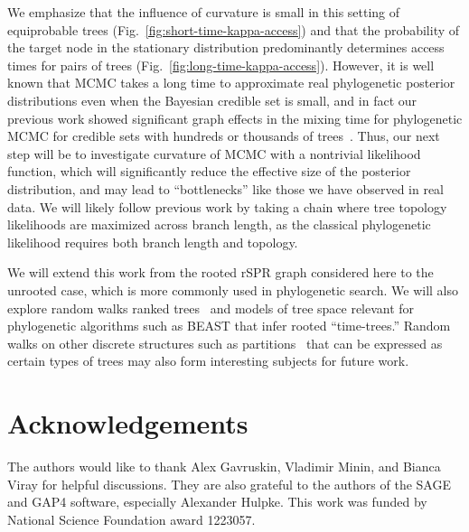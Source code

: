 \documentclass[11pt,onecolumn,conference]{IEEEtran}
\begin{document}
We emphasize that the influence of curvature is small in this setting of equiprobable trees (Fig.~\ref{fig:short-time-kappa-access}) and that the probability of the target node in the stationary distribution predominantly determines access times for pairs of trees (Fig.~\ref{fig:long-time-kappa-access}).
However, it is well known that MCMC takes a long time to approximate real phylogenetic posterior distributions even when the Bayesian credible set is small, and in fact our previous work showed significant graph effects in the mixing time for phylogenetic MCMC for credible sets with hundreds or thousands of trees~\cite{Whidden2015-yi}.
Thus, our next step will be to investigate curvature of MCMC with a nontrivial likelihood function, which will significantly reduce the effective size of the posterior distribution, and may lead to ``bottlenecks'' like those we have observed in real data.
We will likely follow previous work \cite{Stefankovic2011-hu} by taking a chain where tree topology likelihoods are maximized across branch length, as the classical phylogenetic likelihood \cite{felsenstein1981evolutionary} requires both branch length and topology.

We will extend this work from the rooted rSPR graph considered here to the unrooted case, which is more commonly used in phylogenetic search.
We will also explore random walks ranked trees~\cite{Song2006-xe} and models of tree space relevant for phylogenetic algorithms such as BEAST \cite{Drummond2012-ek} that infer rooted ``time-trees.''
Random walks on other discrete structures such as partitions~\cite{Gusfield2002-il} that can be expressed as certain types of trees may also form interesting subjects for future work.


\section{Acknowledgements}
The authors would like to thank Alex Gavruskin, Vladimir Minin, and Bianca Viray for helpful discussions.
They are also grateful to the authors of the SAGE and GAP4 software, especially Alexander Hulpke.
This work was funded by National Science Foundation award 1223057.

\pagebreak



\end{document}
